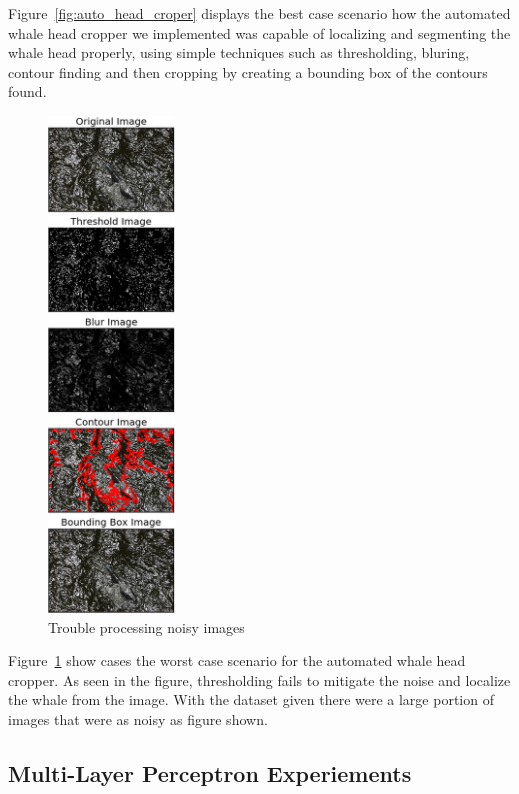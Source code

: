 Figure~\ref{fig:auto_head_croper} displays the best case scenario how the automated whale head cropper we implemented was capable of localizing and segmenting the whale head properly, using simple techniques such as thresholding, bluring, contour finding and then cropping by creating a bounding box of the contours found.

\begin{figure}[H]
	\centering
	\includegraphics[width=0.3\textwidth]{sections/imgs/preprocessing/worst_case.png}
	\caption{Trouble processing noisy images}
	\label{fig:noisy_data}
\end{figure}

Figure~\ref{fig:noisy_data} show cases the worst case scenario for the automated whale head cropper. As seen in the figure, thresholding fails to mitigate the noise and localize the whale from the image. With the dataset given there were a large portion of images that were as noisy as figure shown.



\subsection{Multi-Layer Perceptron Experiements}
\label{sup:mlp_experiments}

